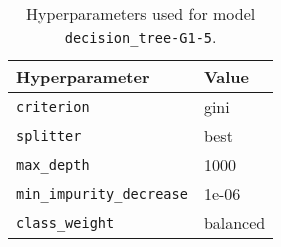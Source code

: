 \begin{table}[H]
\centering
\capstart
\begin{tabularx}{0.48\textwidth}{|X|l|}
\hline
Hyperparameter & Value \\
\hline
\texttt{criterion} & gini \\
\texttt{splitter} & best \\
\texttt{max\_depth} & 1000 \\
\texttt{min\_impurity\_decrease} & 1e-06 \\
\texttt{class\_weight} & balanced \\
\hline
\end{tabularx}
\caption{Hyperparameters used for model \texttt{decision\_tree-G1-5}.}
\label{tab:hyperparameters_best_decision_tree}

\end{table}
